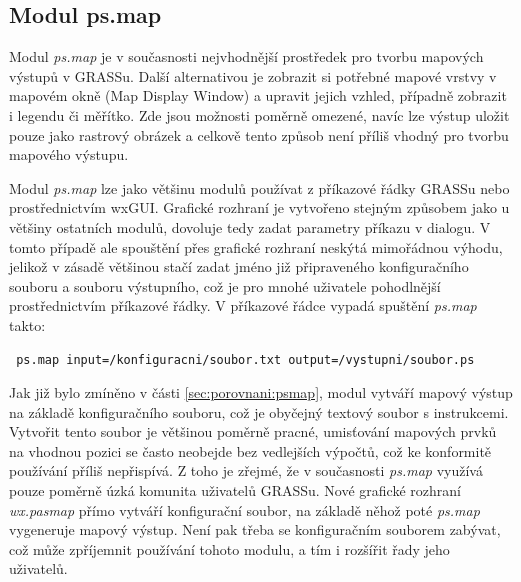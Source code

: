 \documentclass[a4paper,12pt,draft]{article}
\newcommand{\modul}[1]{\emph{#1}}
\begin{document}
\subsection{Modul ps.map}
\label{sec:psmap}
Modul \modul{ps.map} je v současnosti nejvhodnější prostředek pro tvorbu mapových výstupů v GRASSu. Další alternativou je zobrazit si potřebné mapové vrstvy v mapovém okně (Map Display Window)  a upravit jejich vzhled, případně zobrazit i legendu či měřítko. Zde jsou možnosti poměrně omezené, navíc lze výstup uložit pouze jako rastrový obrázek a celkově tento způsob není příliš vhodný pro tvorbu mapového výstupu.

Modul \modul{ps.map} lze jako většinu modulů používat z příkazové řádky GRASSu nebo pro\-střed\-nic\-tvím wxGUI. Grafické rozhraní je vytvořeno stejným způsobem jako u většiny ostatních modulů, dovoluje tedy zadat parametry příkazu v dialogu. V tomto případě ale spouštění přes grafické rozhraní neskýtá mimořádnou výhodu, jelikož v zásadě většinou stačí zadat jméno již připraveného konfiguračního souboru a souboru výstupního, což je pro mnohé uživatele pohodlnější prostřednictvím příkazové řádky. V příkazové řádce vypadá spuštění \modul{ps.map} takto:
\begin{verbatim}
 ps.map input=/konfiguracni/soubor.txt output=/vystupni/soubor.ps   
\end{verbatim}

Jak již bylo zmíněno v části \ref{sec:porovnani:psmap}, modul vytváří mapový výstup na základě konfiguračního souboru, což je obyčejný textový soubor s instrukcemi. Vytvořit tento soubor je většinou poměrně pracné, umisťování mapových prvků na vhodnou pozici se často neobejde bez vedlejších výpočtů, což ke konformitě používání příliš nepřispívá. Z toho je zřejmé, že v současnosti \modul{ps.map} využívá pouze poměrně úzká komunita uživatelů GRASSu. Nové grafické rozhraní \emph{wx.pasmap} přímo vytváří konfigurační soubor, na základě něhož poté \modul{ps.map} vygeneruje mapový výstup. Není pak třeba se konfiguračním souborem zabývat, což může zpříjemnit používání tohoto modulu, a tím i rozšířit řady jeho uživatelů. 
\end{document}
